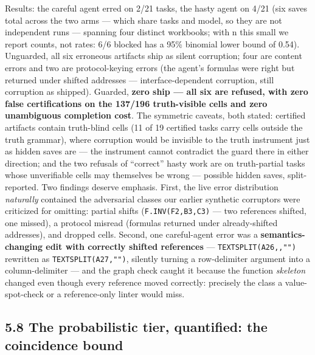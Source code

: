 \documentclass[
  11pt,
]{article}
\begin{document}
Results: the careful agent erred on 2/21 tasks, the hasty agent on 4/21
(six saves total across the two arms --- which share tasks and model, so
they are not independent runs --- spanning four distinct workbooks; with
n this small we report counts, not rates: 6/6 blocked has a 95\%
binomial lower bound of 0.54). Unguarded, all six erroneous artifacts
ship as silent corruption; four are content errors and two are
protocol-keying errors (the agent's formulas were right but returned
under shifted addresses --- interface-dependent corruption, still
corruption as shipped). Guarded, \textbf{zero ship --- all six are
refused, with zero false certifications on the 137/196 truth-visible
cells and zero unambiguous completion cost}. The symmetric caveats, both
stated: certified artifacts contain truth-blind cells (11 of 19
certified tasks carry cells outside the truth grammar), where corruption
would be invisible to the truth instrument just as hidden saves are ---
the instrument cannot contradict the guard there in either direction;
and the two refusals of ``correct'' hasty work are on truth-partial
tasks whose unverifiable cells may themselves be wrong --- possible
hidden saves, split-reported. Two findings deserve emphasis. First, the
live error distribution \emph{naturally} contained the adversarial
classes our earlier synthetic corruptors were criticized for omitting:
partial shifts (\texttt{F.INV(F2,B3,C3)} --- two references shifted, one
missed), a protocol misread (formulas returned under already-shifted
addresses), and dropped cells. Second, one careful-agent error was a
\textbf{semantics-changing edit with correctly shifted references} ---
\texttt{TEXTSPLIT(A26,,"")} rewritten as \texttt{TEXTSPLIT(A27,"")},
silently turning a row-delimiter argument into a column-delimiter ---
and the graph check caught it because the function \emph{skeleton}
changed even though every reference moved correctly: precisely the class
a value-spot-check or a reference-only linter would miss.

\subsection{5.8 The probabilistic tier, quantified: the coincidence
bound}\label{the-probabilistic-tier-quantified-the-coincidence-bound}
\end{document}
